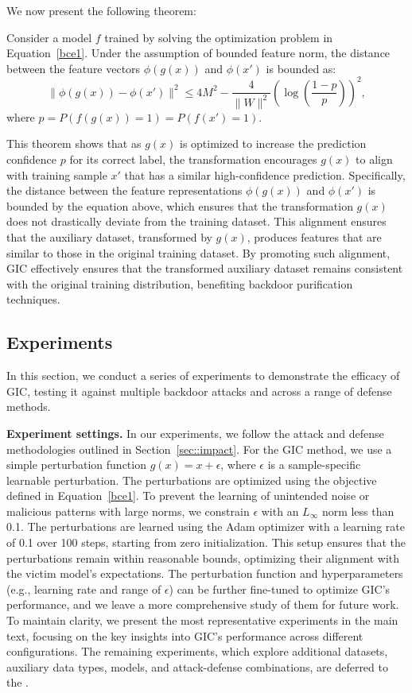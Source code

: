 We now present the following theorem:  

\begin{theorem}
\label{thm}
Consider a model $f$ trained by solving the optimization problem in Equation~\ref{bce1}.  Under the assumption of bounded feature norm, the distance between the feature vectors $\phi(g(x))$ and $\phi(x')$ is bounded as:  
\[
\|\phi(g(x)) - \phi(x')\|^2 \leq 4M^2 - \frac{4}{\|W\|^2} \left( \log\left( \frac{1 - p}{p} \right) \right)^2,
\]  
where $p = P(f(g(x)) = 1)= P(f(x') = 1)$.
\end{theorem}

This theorem shows that as $g(x)$ is optimized to increase the prediction confidence $p$ for its correct label, the transformation encourages $g(x)$ to align with training sample $x'$ that has a similar high-confidence prediction. Specifically, the distance between the feature representations $\phi(g(x))$ and $\phi(x')$ is bounded by the equation above, which ensures that the transformation $g(x)$  does not drastically deviate from the training dataset. This alignment ensures that the auxiliary dataset, transformed by $g(x)$, produces features that are similar to those in the original training dataset. By promoting such alignment, GIC effectively ensures that the transformed auxiliary dataset remains consistent with the original training distribution, benefiting backdoor purification techniques. 

\subsection{Experiments}

In this section, we conduct a series of experiments to demonstrate the efficacy of GIC, testing it against multiple backdoor attacks and across a range of defense methods.

\textbf{Experiment settings.} In our experiments, we follow the attack and defense methodologies outlined in Section~\ref{sec::impact}. For the GIC method, we use a simple perturbation function \( g(x) = x + \epsilon \), where \( \epsilon \) is a sample-specific learnable perturbation. The perturbations are optimized using the objective defined in Equation~\ref{bce1}. To prevent the learning of unintended noise or malicious patterns with large norms, we constrain \( \epsilon \) with an $L_{\infty}$ norm less than 0.1. The perturbations are learned using the Adam optimizer with a learning rate of 0.1 over 100 steps, starting from zero initialization. This setup ensures that the perturbations remain within reasonable bounds, optimizing their alignment with the victim model’s expectations. The perturbation function and hyperparameters (e.g., learning rate and range of \( \epsilon \)) can be further fine-tuned to optimize GIC's performance, and we leave a more comprehensive study of them for future work. To maintain clarity, we present the most representative experiments in the main text, focusing on the key insights into GIC's performance across different configurations. The remaining experiments, which explore additional datasets, auxiliary data types, models, and attack-defense combinations, are deferred to the \app. 


